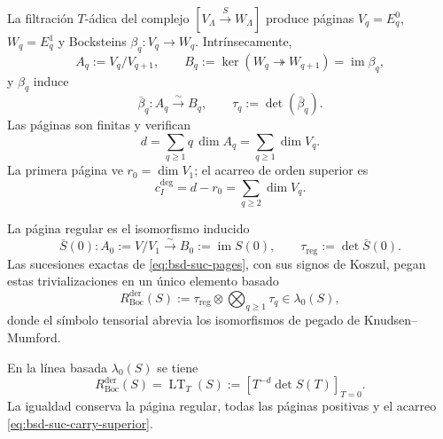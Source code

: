 La filtración \(T\)-ádica del complejo
\([V_{\Lambda}\xrightarrow{S}W_{\Lambda}]\) produce páginas
\(V_q=E_q^0\), \(W_q=E_q^1\) y Bocksteins
\(\beta_q:V_q\to W_q\). Intrínsecamente,
\begin{equation}\label{eq:bsd-suc-pages}
 A_q:=V_q/V_{q+1},
 \qquad
 B_q:=\ker(W_q\twoheadrightarrow W_{q+1})
      =\operatorname{im}\beta_q,
\end{equation}
y \(\beta_q\) induce
\begin{equation}\label{eq:bsd-suc-beta-q}
 \bar\beta_q:A_q\xrightarrow{\ \sim\ }B_q,
 \qquad
 \tau_q:=\det(\bar\beta_q).
\end{equation}
Las páginas son finitas y verifican
\begin{equation}\label{eq:bsd-suc-carry-orden}
 d=\sum_{q\geq1}q\,\dim A_q
  =\sum_{q\geq1}\dim V_q.
\end{equation}
La primera página ve
\(r_0=\dim V_1\); el acarreo de orden superior es
\begin{equation}\label{eq:bsd-suc-carry-superior}
 c_I^{\deg}=d-r_0=\sum_{q\geq2}\dim V_q.
\end{equation}

La página regular es el isomorfismo inducido
\begin{equation}\label{eq:bsd-suc-pagina-regular}
 \bar S(0):A_0:=V/V_1
 \xrightarrow{\ \sim\ }
 B_0:=\operatorname{im}S(0),
 \qquad
 \tau_{\mathrm{reg}}:=\det\bar S(0).
\end{equation}
Las sucesiones exactas de \eqref{eq:bsd-suc-pages}, con sus signos de
Koszul, pegan estas trivializaciones en un único elemento basado
\begin{equation}\label{eq:bsd-suc-rboc}
 R_{\mathrm{Boc}}^{\mathrm{der}}(S)
 :=\tau_{\mathrm{reg}}\otimes
   \bigotimes_{q\geq1}\tau_q
 \in\lambda_0(S),
\end{equation}
donde el símbolo tensorial abrevia los isomorfismos de pegado de
Knudsen--Mumford.

\begin{theorem}
\label{thm:bsd-suc-bockstein}
En la línea basada \(\lambda_0(S)\) se tiene
\begin{equation}\label{eq:bsd-suc-lt}
 R_{\mathrm{Boc}}^{\mathrm{der}}(S)
 =\operatorname{LT}_{T}(S)
 :=\left[T^{-d}\det S(T)\right]_{T=0}.
\end{equation}
La igualdad conserva la página regular, todas las páginas positivas y el
acarreo \eqref{eq:bsd-suc-carry-superior}.
\end{theorem}

